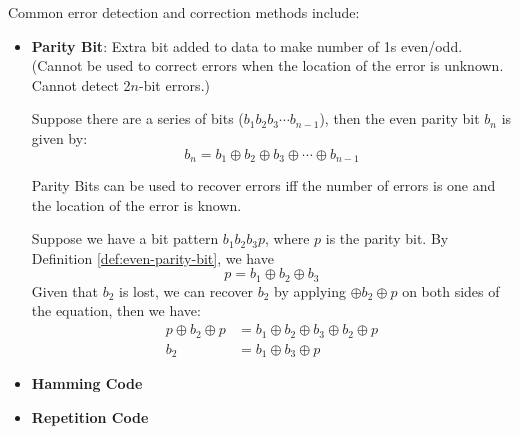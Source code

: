 Common error detection and correction methods include:
\begin{itemize}
    \item \textbf{Parity Bit}: Extra bit added to data to make number of 1s even/odd.
        (Cannot be used to correct errors when the location of the error is unknown.
        Cannot detect 2$n$-bit errors.)
        \begin{definition}\label{def:even-parity-bit}
            Suppose there are a series of bits ($b_1b_2b_3\cdots b_{n-1}$), then the even
            parity bit $b_n$ is given by:
            \begin{equation*}
                b_n = b_1 \oplus b_2 \oplus b_3 \oplus \cdots \oplus b_{n-1}
            \end{equation*}
        \end{definition}
        \begin{theorem}
            Parity Bits can be used to recover errors iff the number of errors is one
            and the location of the error is known.
            \begin{example} \label{ex:parity-bit-error-correction}
                Suppose we have a bit pattern $b_1b_2b_3p$, where $p$ is the parity bit.
                By Definition \ref{def:even-parity-bit}, we have \[p = b_1 \oplus b_2 \oplus b_3\]
                Given that $b_2$ is lost, we can recover $b_2$ by applying $\oplus b_2 \oplus p$ on
                both sides of the equation, then we have:
                \begin{align*}
                    p\oplus b_2 \oplus p &= b_1 \oplus b_2 \oplus b_3 \oplus b_2 \oplus p \\
                    b_2 &= \boxed{b_1 \oplus b_3 \oplus p}
                \end{align*}
            \end{example}       
        \end{theorem}
    \item \textbf{Hamming Code}
    \item \textbf{Repetition Code}
\end{itemize}